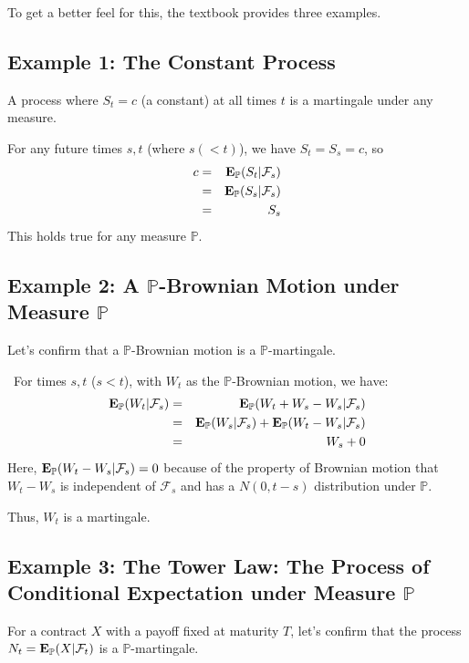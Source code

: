 \documentclass[uplatex,a4j,12pt,dvipdfmx]{jsarticle}
\begin{document}
To get a better feel for this, the textbook provides three examples.
\subsection{Example 1: The Constant Process}

A process where $S_{t}=c$ (a constant) at all times $t$ is a martingale under any measure.

For any future times $s,t$ (where $s(<t)$), we have $S_{t}=S_{s}=c$, so
%
\begin{eqnarray*}
	c
	&=&
	{\bf E}_{\mathbb{P}}( S_{t} | \mathcal{F}_{s} )
	\\ &=&
	{\bf E}_{\mathbb{P}}( S_{s} | \mathcal{F}_{s} )
	\\ &=&
	S_{s}
\end{eqnarray*}
%
This holds true for any measure $\mathbb{P}$.
\subsection{Example 2: A $\mathbb{P}$-Brownian Motion under Measure $\mathbb{P}$}

Let's confirm that a $\mathbb{P}$-Brownian motion is a $\mathbb{P}$-martingale.

\
For times $s,t$ ($s<t$), with $W_{t}$ as the $\mathbb{P}$-Brownian motion, we have:
%
\begin{eqnarray*}
	{\bf E}_{\mathbb{P}}( W_{t} | \mathcal{F}_{s} )
	&=&
	{\bf E}_{\mathbb{P}}( W_{t} + W_{s} - W_{s} | \mathcal{F}_{s} )
	\\ &=&
	{\bf E}_{\mathbb{P}}( W_{s} | \mathcal{F}_{s} )
	+
	{\bf E}_{\mathbb{P}}( W_{t} - W_{s} | \mathcal{F}_{s} )
	\\ &=&
	W_{s}
	+
	0
\end{eqnarray*}
%
Here, ${\bf E}_{\mathbb{P}}( W_{t} - W_{s} | \mathcal{F}_{s} ) =0$ because of the property of Brownian motion that $W_{t} - W_{s}$ is independent of $\mathcal{F}_{s}$ and has a $N(0,t-s)$ distribution under $\mathbb{P}$.

Thus, $W_{t}$ is a martingale.

\subsection{Example 3: The Tower Law: The Process of Conditional Expectation under Measure $\mathbb{P}$}

For a contract $X$ with a payoff fixed at maturity $T$, let's confirm that the process $N_{t} = {\bf E}_{\mathbb{P}}( X | \mathcal{F}_{t} )$ is a $\mathbb{P}$-martingale.
\end{document}
